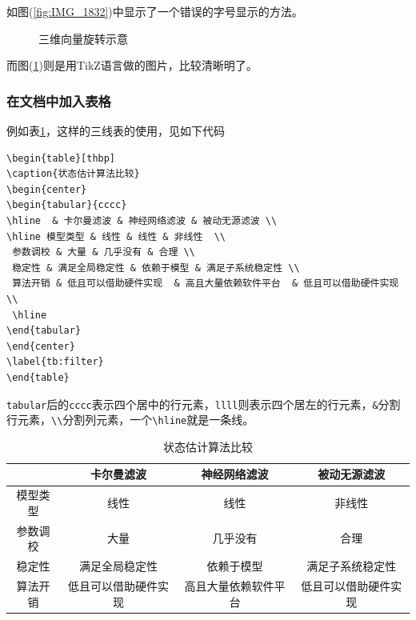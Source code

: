 如图(\ref{fig:IMG_1832})中显示了一个错误的字号显示的方法。
\begin{figure}[h]
\centering
{}
\caption{三维向量旋转示意}
\label{fig:3Drot}
\end{figure}

而图(\ref{fig:3Drot})则是用TikZ语言做的图片，比较清晰明了。
\subsubsection{在文档中加入表格}
例如表\ref{tb:filter}，这样的三线表的使用，见如下代码
\begin{verbatim}
\begin{table}[thbp]
\caption{状态估计算法比较}
\begin{center}
\begin{tabular}{cccc}
\hline  & 卡尔曼滤波 & 神经网络滤波 & 被动无源滤波 \\ 
\hline 模型类型 & 线性 & 线性 & 非线性  \\ 
 参数调校 & 大量 & 几乎没有 & 合理 \\ 
 稳定性 & 满足全局稳定性 & 依赖于模型 & 满足子系统稳定性 \\ 
 算法开销 & 低且可以借助硬件实现  & 高且大量依赖软件平台  & 低且可以借助硬件实现  \\ 
 \hline
\end{tabular} 
\end{center}
\label{tb:filter}
\end{table}
\end{verbatim}
\verb|tabular|后的\verb|cccc|表示四个居中的行元素，\verb|llll|则表示四个居左的行元素，\verb|&|分割行元素，\verb|\\|分割列元素，一个\verb|\hline|就是一条线。
\begin{table}[thbp]
\caption{状态估计算法比较}
\begin{center}
\begin{tabular}{cccc}
\hline  & 卡尔曼滤波 & 神经网络滤波 & 被动无源滤波 \\ 
\hline 模型类型 & 线性 & 线性 & 非线性  \\ 
 参数调校 & 大量 & 几乎没有 & 合理 \\ 
 稳定性 & 满足全局稳定性 & 依赖于模型 & 满足子系统稳定性 \\ 
 算法开销 & 低且可以借助硬件实现  & 高且大量依赖软件平台  & 低且可以借助硬件实现  \\ 
 \hline
\end{tabular} 
\end{center}
\label{tb:filter}
\end{table}

